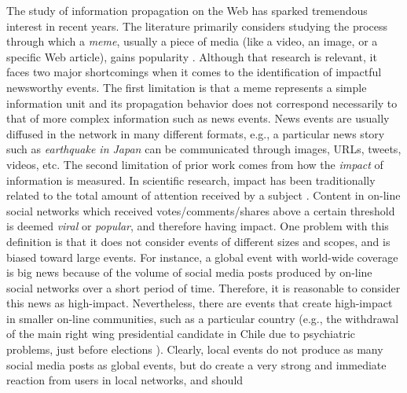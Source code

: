 \documentclass[10pt,letterpaper]{article}
\begin{document}

The study of information propagation on the Web has sparked tremendous
interest in recent years. The literature primarily considers studying
the process through which a {\em meme}, usually a piece of media (like
a video, an image, or a specific Web article), gains popularity
\cite{Castillo:2014,Szabo:2010,Lerman:2010,Tatar:2011,Pinto:2013,Ahmed:2013,Zaman_information_spreading,suh2010want}.
Although that research is relevant, it faces two major shortcomings
when it comes to the identification of impactful newsworthy events.
The first limitation is that a meme represents a simple information
unit and its propagation behavior does not correspond necessarily to
that of more complex information such as news events. News events are
usually diffused in the network in many different formats, e.g., a
particular news story such as {\em earthquake in Japan} can be
communicated through images, URLs, tweets, videos, etc. The second
limitation of prior work comes from how the {\em impact} of
information is measured. In scientific research, impact has been
traditionally related to the total amount of attention received by a
subject
\cite{berger2012makes,iribarren2011branching,guerini2011exploring,mills2012virality,gaugaz2012predicting}.
Content in on-line social networks which received
votes/comments/shares above a certain threshold is deemed {\em viral}
or {\em popular}, and therefore having impact. One problem with this
definition is that it does not consider events of different sizes and
scopes, and is biased toward large events. For instance, a global
event with world-wide coverage is big news because of the volume of social media
posts produced by on-line social networks over a short period of time.
Therefore, it is reasonable to consider this news as high-impact.
Nevertheless, there are events that create high-impact in smaller
on-line communities, such as a particular country (e.g., the
withdrawal of the main right wing presidential candidate in Chile due
to psychiatric problems, just before
elections \cite{chile_elections}).
Clearly, local events do not produce
as many social media posts as global events, but do create a very
strong and immediate reaction from users in local networks, and should
\end{document}
